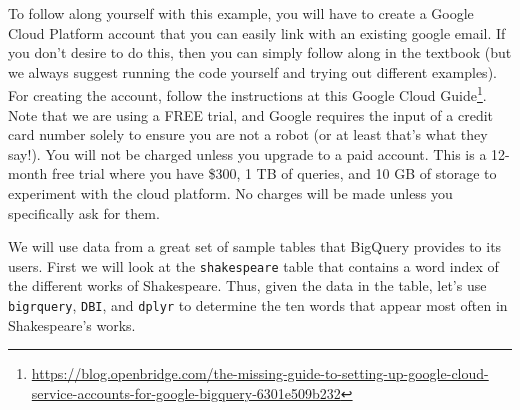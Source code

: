 \documentclass[]{krantz}
\makeatletter
\newenvironment{Shaded}{\begin{snugshade}}{\end{snugshade}}
\newcommand{\DataTypeTok}[1]{\textcolor[rgb]{0.27,0.27,0.27}{#1}}
\newcommand{\KeywordTok}[1]{\textcolor[rgb]{0.27,0.27,0.27}{\textbf{#1}}}
\newcommand{\NormalTok}[1]{#1}
\newcommand{\OperatorTok}[1]{\textcolor[rgb]{0.43,0.43,0.43}{\textbf{#1}}}
\newcommand{\StringTok}[1]{\textcolor[rgb]{0.5,0.5,0.5}{#1}}
\renewcommand{\href}[2]{#2\footnote{\url{#1}}}
\newenvironment{kframe}{%
\medskip{}
\setlength{\fboxsep}{.8em}
 \def\at@end@of@kframe{}%
 \ifinner\ifhmode%
  \def\at@end@of@kframe{\end{minipage}}%
  \begin{minipage}{\columnwidth}%
 \fi\fi%
 \def\FrameCommand##1{\hskip\@totalleftmargin \hskip-\fboxsep
 \colorbox{shadecolor}{##1}\hskip-\fboxsep
     \hskip-\linewidth \hskip-\@totalleftmargin \hskip\columnwidth}%
 \MakeFramed {\advance\hsize-\width
   \@totalleftmargin\z@ \linewidth\hsize
   \@setminipage}}%
 {\par\unskip\endMakeFramed%
 \at@end@of@kframe}
\renewenvironment{Shaded}{\begin{kframe}}{\end{kframe}}
\makeatother
\begin{document}
To follow along yourself with this example, you will have to create a Google Cloud Platform account that you can easily link with an existing google email. If you don't desire to do this, then you can simply follow along in the textbook (but we always suggest running the code yourself and trying out different examples). For creating the account, follow the instructions at this \href{https://blog.openbridge.com/the-missing-guide-to-setting-up-google-cloud-service-accounts-for-google-bigquery-6301e509b232}{Google Cloud Guide}. Note that we are using a FREE trial, and Google requires the input of a credit card number solely to ensure you are not a robot (or at least that's what they say!). You will not be charged unless you upgrade to a paid account. This is a 12-month free trial where you have \$300, 1 TB of queries, and 10 GB of storage to experiment with the cloud platform. No charges will be made unless you specifically ask for them.

We will use data from a great set of sample tables that BigQuery provides to its users. First we will look at the \texttt{shakespeare} table that contains a word index of the different works of Shakespeare. Thus, given the data in the table, let's use \texttt{bigrquery}, \texttt{DBI}, and \texttt{dplyr} to determine the ten words that appear most often in Shakespeare's works.

\begin{Shaded}
\end{Shaded}
\end{document}
